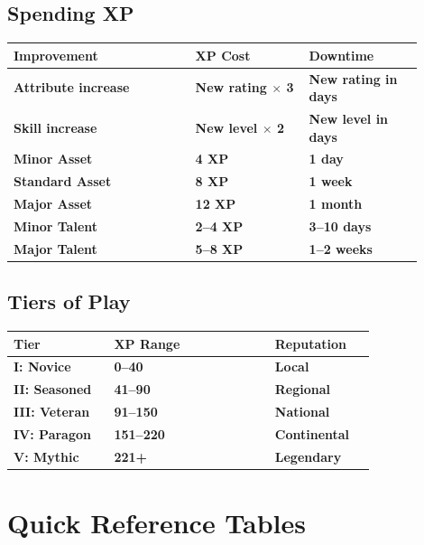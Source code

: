 \documentclass[10pt,twocolumn]{article} %
\begin{document}
\subsection{Spending XP}
\begin{coretable}[XP Costs]
\begin{tabular}{>{\bfseries}p{0.4\linewidth} >{\bfseries}p{0.25\linewidth} >{\bfseries}p{0.25\linewidth}}
\toprule
\textbf{Improvement} & \textbf{XP Cost} & \textbf{Downtime} \\
\midrule
Attribute increase & New rating $\times$ 3 & New rating in days \\
Skill increase & New level $\times$ 2 & New level in days \\
Minor Asset & 4 XP & 1 day \\
Standard Asset & 8 XP & 1 week \\
Major Asset & 12 XP & 1 month \\
Minor Talent & 2--4 XP & 3--10 days \\
Major Talent & 5--8 XP & 1--2 weeks \\
\bottomrule
\end{tabular}
\end{coretable}

\subsection{Tiers of Play}
\begin{coretable}
\begin{tabular}{>{\bfseries}p{0.25\linewidth} >{\bfseries}p{0.4\linewidth} >{\bfseries}p{0.25\linewidth}}
\toprule
\textbf{Tier} & \textbf{XP Range} & \textbf{Reputation} \\
\midrule
I: Novice & 0--40 & Local \\
II: Seasoned & 41--90 & Regional \\
III: Veteran & 91--150 & National \\
IV: Paragon & 151--220 & Continental \\
V: Mythic & 221+ & Legendary \\
\bottomrule
\end{tabular}
\end{coretable}

\section{Quick Reference Tables}
\end{document}
